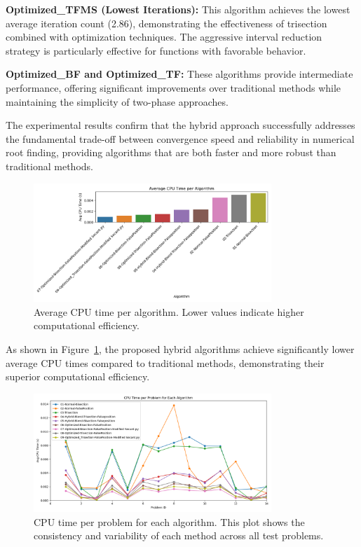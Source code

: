\documentclass[amsmath, amssymb, aps]{revtex4-2}
\begin{document}
\textbf{Optimized\_TFMS (Lowest Iterations):} This algorithm achieves the lowest average iteration count (2.86), demonstrating the effectiveness of trisection combined with optimization techniques. The aggressive interval reduction strategy is particularly effective for functions with favorable behavior.

\textbf{Optimized\_BF and Optimized\_TF:} These algorithms provide intermediate performance, offering significant improvements over traditional methods while maintaining the simplicity of two-phase approaches.

The experimental results confirm that the hybrid approach successfully addresses the fundamental trade-off between convergence speed and reliability in numerical root finding, providing algorithms that are both faster and more robust than traditional methods.


\begin{figure}[H]
    \centering
    \includegraphics[width=0.8\textwidth]{avg_cpu_time_per_algorithm.png}
    \caption{Average CPU time per algorithm. Lower values indicate higher computational efficiency.}
    \label{fig:avg_cpu_time_per_algorithm}
\end{figure}

As shown in Figure~\ref{fig:avg_cpu_time_per_algorithm}, the proposed hybrid algorithms achieve significantly lower average CPU times compared to traditional methods, demonstrating their superior computational efficiency.

\begin{figure}[H]
    \centering
    \includegraphics[width=0.8\textwidth]{cpu_time_lineplot_per_problem.png}
    \caption{CPU time per problem for each algorithm. This plot shows the consistency and variability of each method across all test problems.}
    \label{fig:cpu_time_lineplot_per_problem}
\end{figure}
\end{document}
